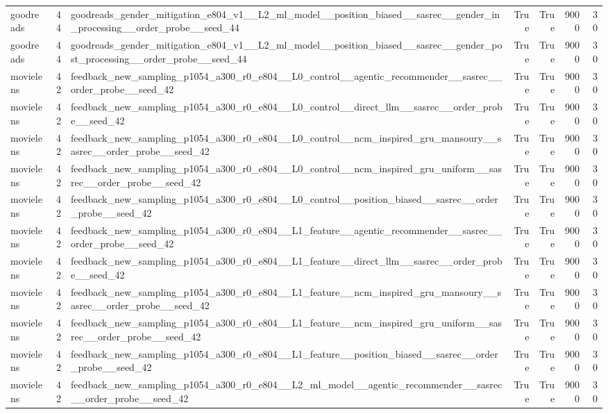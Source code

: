 \begin{table}[htbp!]
\begin{tabular}{lrlrrrr}
goodreads & 44 & goodreads\_gender\_mitigation\_e804\_v1\_\_L2\_ml\_model\_\_position\_biased\_\_sasrec\_\_gender\_in\_processing\_\_order\_probe\_\_seed\_44 & True & True & 9000 & 30 \\
goodreads & 44 & goodreads\_gender\_mitigation\_e804\_v1\_\_L2\_ml\_model\_\_position\_biased\_\_sasrec\_\_gender\_post\_processing\_\_order\_probe\_\_seed\_44 & True & True & 9000 & 30 \\
movielens & 42 & feedback\_new\_sampling\_p1054\_a300\_r0\_e804\_\_L0\_control\_\_agentic\_recommender\_\_sasrec\_\_order\_probe\_\_seed\_42 & True & True & 9000 & 30 \\
movielens & 42 & feedback\_new\_sampling\_p1054\_a300\_r0\_e804\_\_L0\_control\_\_direct\_llm\_\_sasrec\_\_order\_probe\_\_seed\_42 & True & True & 9000 & 30 \\
movielens & 42 & feedback\_new\_sampling\_p1054\_a300\_r0\_e804\_\_L0\_control\_\_ncm\_inspired\_gru\_mansoury\_\_sasrec\_\_order\_probe\_\_seed\_42 & True & True & 9000 & 30 \\
movielens & 42 & feedback\_new\_sampling\_p1054\_a300\_r0\_e804\_\_L0\_control\_\_ncm\_inspired\_gru\_uniform\_\_sasrec\_\_order\_probe\_\_seed\_42 & True & True & 9000 & 30 \\
movielens & 42 & feedback\_new\_sampling\_p1054\_a300\_r0\_e804\_\_L0\_control\_\_position\_biased\_\_sasrec\_\_order\_probe\_\_seed\_42 & True & True & 9000 & 30 \\
movielens & 42 & feedback\_new\_sampling\_p1054\_a300\_r0\_e804\_\_L1\_feature\_\_agentic\_recommender\_\_sasrec\_\_order\_probe\_\_seed\_42 & True & True & 9000 & 30 \\
movielens & 42 & feedback\_new\_sampling\_p1054\_a300\_r0\_e804\_\_L1\_feature\_\_direct\_llm\_\_sasrec\_\_order\_probe\_\_seed\_42 & True & True & 9000 & 30 \\
movielens & 42 & feedback\_new\_sampling\_p1054\_a300\_r0\_e804\_\_L1\_feature\_\_ncm\_inspired\_gru\_mansoury\_\_sasrec\_\_order\_probe\_\_seed\_42 & True & True & 9000 & 30 \\
movielens & 42 & feedback\_new\_sampling\_p1054\_a300\_r0\_e804\_\_L1\_feature\_\_ncm\_inspired\_gru\_uniform\_\_sasrec\_\_order\_probe\_\_seed\_42 & True & True & 9000 & 30 \\
movielens & 42 & feedback\_new\_sampling\_p1054\_a300\_r0\_e804\_\_L1\_feature\_\_position\_biased\_\_sasrec\_\_order\_probe\_\_seed\_42 & True & True & 9000 & 30 \\
movielens & 42 & feedback\_new\_sampling\_p1054\_a300\_r0\_e804\_\_L2\_ml\_model\_\_agentic\_recommender\_\_sasrec\_\_order\_probe\_\_seed\_42 & True & True & 9000 & 30 \\

\end{tabular}
\end{table}
